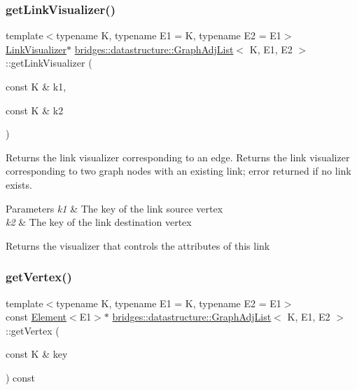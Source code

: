 \subsubsection{\texorpdfstring{get\+Link\+Visualizer()}{getLinkVisualizer()}}
{\footnotesize\ttfamily template$<$typename K, typename E1 = K, typename E2 = E1$>$ \\
\hyperlink{classbridges_1_1datastructure_1_1_link_visualizer}{Link\+Visualizer}$\ast$ \hyperlink{classbridges_1_1datastructure_1_1_graph_adj_list}{bridges\+::datastructure\+::\+Graph\+Adj\+List}$<$ K, E1, E2 $>$\+::get\+Link\+Visualizer (\begin{DoxyParamCaption}\item[{const K \&}]{k1,  }\item[{const K \&}]{k2 }\end{DoxyParamCaption})\hspace{0.3cm}{\ttfamily [inline]}}



Returns the link visualizer corresponding to an edge. Returns the link visualizer corresponding to two graph nodes with an existing link; error returned if no link exists. 


\begin{DoxyParams}{Parameters}
{\em k1} & The key of the link source vertex \\
\hline
{\em k2} & The key of the link destination vertex\\
\hline
\end{DoxyParams}
\begin{DoxyReturn}{Returns}
the visualizer that controls the attributes of this link 
\end{DoxyReturn}
\mbox{\label{classbridges_1_1datastructure_1_1_graph_adj_list_ada58af550495cee2fe454c0be0f8504e}} 
\subsubsection{\texorpdfstring{get\+Vertex()}{getVertex()}\hspace{0.1cm}{\footnotesize\ttfamily [1/2]}}
{\footnotesize\ttfamily template$<$typename K, typename E1 = K, typename E2 = E1$>$ \\
const \hyperlink{classbridges_1_1datastructure_1_1_element}{Element}$<$E1$>$$\ast$ \hyperlink{classbridges_1_1datastructure_1_1_graph_adj_list}{bridges\+::datastructure\+::\+Graph\+Adj\+List}$<$ K, E1, E2 $>$\+::get\+Vertex (\begin{DoxyParamCaption}\item[{const K \&}]{key }\end{DoxyParamCaption}) const\hspace{0.3cm}{\ttfamily [inline]}}




